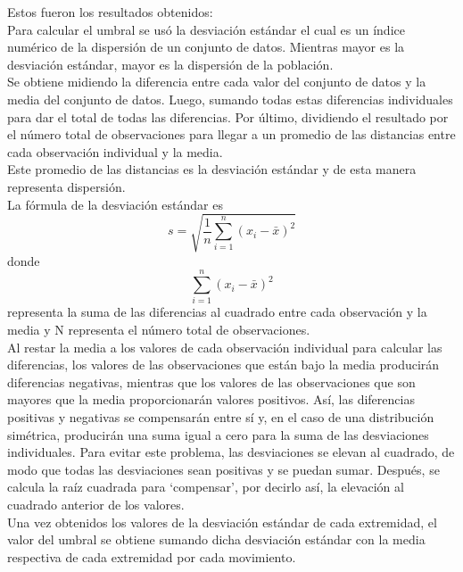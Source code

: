 Estos fueron los resultados obtenidos:\\

Para calcular el umbral se usó la desviación estándar el cual es un índice numérico de la dispersión de un conjunto de datos. Mientras mayor es la desviación estándar, mayor es la dispersión de la población.\\
Se obtiene midiendo la diferencia entre cada valor del conjunto de datos y la media del conjunto de datos. Luego, sumando todas estas diferencias individuales para dar el total de todas las diferencias. Por último, dividiendo el resultado por el número total de observaciones para llegar a un promedio de las distancias entre cada observación individual y la media.\\

Este promedio de las distancias es la desviación estándar y de esta manera representa dispersión.\\

La fórmula de la desviación estándar es \begin{equation} s = \sqrt{\frac{1}{n} \sum_{i=1}^n \left(x_i - \bar{x}\right)^2} \end{equation}  donde \begin{equation} \sum_{i=1}^n \left(x_i - \bar{x}\right)^2 \end{equation} representa la suma de las diferencias al cuadrado entre cada observación y la media y N representa el número total de observaciones. \\

Al restar la media a los valores de cada observación individual para calcular las diferencias, los valores de las observaciones que están bajo la media producirán diferencias negativas, mientras que los valores de las observaciones que son mayores que la media proporcionarán valores positivos. Así, las diferencias positivas y negativas se compensarán entre sí y, en el caso de una distribución simétrica, producirán una suma igual a cero para la suma de las desviaciones individuales. Para evitar este problema, las desviaciones se elevan al cuadrado, de modo que todas las desviaciones sean positivas y se puedan sumar. Después, se calcula la raíz cuadrada para ‘compensar’, por decirlo así, la elevación al cuadrado anterior de los valores.\\

Una vez obtenidos los valores de la desviación estándar de cada extremidad, el valor del umbral se obtiene sumando dicha desviación estándar con la media respectiva de cada extremidad por cada movimiento.

